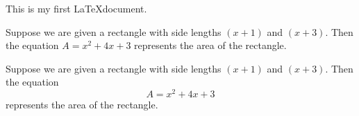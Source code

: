 \documentclass[11pt]{article}
\begin{document}
This is my first \LaTeX document.

Suppose we are given a rectangle with side lengths $(x+1)$ and $(x+3)$. Then the equation $A=x^2+4x+3$ represents the area of the rectangle.

Suppose we are given a rectangle with side lengths $(x+1)$ and $(x+3)$. Then the equation $$A=x^2+4x+3$$ represents the area of the rectangle.
\end{document}
